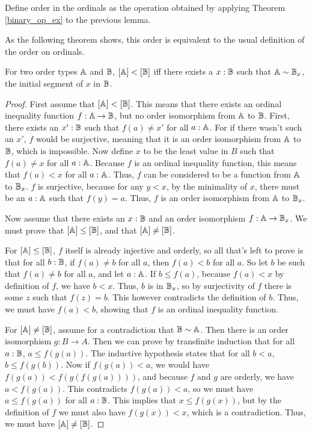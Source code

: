 \documentclass[../../math.tex]{subfiles}
\begin{document}
\begin{instance}
    Define order in the ordinals as the operation obtained by applying Theorem
    \ref{binary_op_ex} to the previous lemma.
\end{instance}

As the following theorem shows, this order is equivalent to the usual definition
of the order on ordinals.

\begin{theorem} \label{ord_lt_simpl}
    For two order types $\mathbb{A}$ and $\mathbb{B}$, $[\mathbb{A}] < [\mathbb{B}]$ iff there exists a $x : \mathbb{B}$
    such that $\mathbb{A} \sim \mathbb{B}_x$, the initial segment of $x$ in $\mathbb{B}$.
\end{theorem}
\begin{proof}
    First assume that $[\mathbb{A}] < [\mathbb{B}]$.  This means that there exists an ordinal
    inequality function $f : \mathbb{A} \to \mathbb{B}$, but no order isomorphism from $\mathbb{A}$ to
    $\mathbb{B}$.  First, there exists an $x' : \mathbb{B}$ such that $f(a) \neq x'$ for all $a
    : \mathbb{A}$.  For if there wasn't such an $x'$, $f$ would be surjective, meaning
    that it is an order isomorphism from $\mathbb{A}$ to $\mathbb{B}$, which is impossible.  Now
    define $x$ to be the least value in $B$ such that $f(a) \neq x$ for all $a :
    \mathbb{A}$.  Because $f$ is an ordinal inequality function, this means that $f(a) <
    x$ for all $a : \mathbb{A}$.  Thus, $f$ can be considered to be a function from $\mathbb{A}$
    to $\mathbb{B}_x$.  $f$ is surjective, because for any $y < x$, by the minimality of
    $x$, there must be an $a : \mathbb{A}$ such that $f(y) = a$.  Thus, $f$ is an order
    isomorphism from $\mathbb{A}$ to $\mathbb{B}_x$.

    Now assume that there exists an $x : \mathbb{B}$ and an order isomorphism $f : \mathbb{A}
    \to \mathbb{B}_x$.  We must prove that $[\mathbb{A}] \leq [\mathbb{B}]$, and that $[\mathbb{A}] \neq [\mathbb{B}]$.

    For $[\mathbb{A}] \leq [\mathbb{B}]$, $f$ itself is already injective and orderly, so all
    that's left to prove is that for all $b : \mathbb{B}$, if $f(a) \neq b$ for all $a$,
    then $f(a) < b$ for all $a$.  So let $b$ be such that $f(a) \neq b$ for all
    $a$, and let $a : \mathbb{A}$.  If $b \leq f(a)$, because $f(a) < x$ by definition
    of $f$, we have $b < x$.  Thus, $b$ is in $\mathbb{B}_x$, so by surjectivity of $f$
    there is some $z$ such that $f(z) = b$.  This however contradicts the
    definition of $b$.  Thus, we must have $f(a) < b$, showing that $f$ is an
    ordinal inequality function.

    For $[\mathbb{A}] \neq [\mathbb{B}]$, assume for a contradiction that $\mathbb{B} \sim \mathbb{A}$.  Then
    there is an order isomorphism $g : B \to A$.  Then we can prove by
    transfinite induction that for all $a : \mathbb{B}$, $a \leq f(g(a))$.  The
    inductive hypothesis states that for all $b < a$, $b \leq f(g(b))$.  Now if
    $f(g(a)) < a$, we would have $f(g(a)) < f(g(f(g(a))))$, and because $f$ and
    $g$ are orderly, we have $a < f(g(a))$.  This contradicts $f(g(a)) < a$, so
    we must have $a \leq f(g(a))$ for all $a : \mathbb{B}$.  This implies that $x \leq
    f(g(x))$, but by the definition of $f$ we must also have $f(g(x)) < x$,
    which is a contradiction.  Thus, we must have $[\mathbb{A}] \neq [\mathbb{B}]$.
\end{proof}
\end{document}
